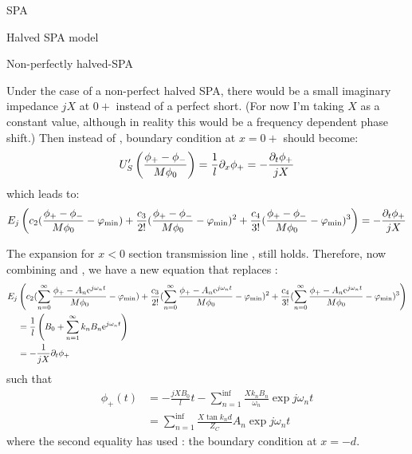 \documentclass[12pt,a4paper]{article}
\begin{document}
\begin{section}{SPA}
\begin{subsection}{Halved SPA model}
\end{subsection}


\begin{subsection}{Non-perfectly halved-SPA}

Under the case of a non-perfect halved SPA, there would be a small imaginary impedance $jX$ at $0+$ instead of a perfect short. (For now I'm taking $X$ as a constant value, although in reality this would be a frequency dependent phase shift.)
Then instead of , boundary condition at $x=0+$ should become:
\begin{equation}\label{eq:BC0+}
U_S'\left(\frac{\phi_+ - \phi_-}{M \phi_0}\right) = \frac{1}{l}\partial_x\phi_+ = -\frac{\partial_t\phi_+}{jX}
\end{equation}
which leads to: 
\begin{equation}\label{eq:BC0++}
E_j \left( c_2(\frac{\phi_+ - \phi_-}{M\phi_0} - \varphi_{\mathrm{min}}) + \frac{c_3}{2!}(\frac{\phi_+ - \phi_-}{M\phi_0} - \varphi_{\mathrm{min}})^2 +  \frac{c_4}{3!}(\frac{\phi_+ - \phi_-}{M\phi_0} - \varphi_{\mathrm{min}})^3 \right) = -\frac{\partial_t\phi_+}{jX}
\end{equation}

The expansion for $x<0$ section transmission line , still holds. Therefore, now combining  and , we have a new equation that replaces : 
\begin{equation}
\begin{aligned}
E_j &\left( c_2(\sum_{n=0}^\infty{\frac{\phi_+ - A_n \mathrm{e}^{j\omega_n t}}{M\phi_0}} - \varphi_{\mathrm{min}}) + \frac{c_3}{2!}(\sum_{n=0}^\infty{\frac{\phi_+ - A_n \mathrm{e}^{j\omega_n t}}{M\phi_0}} - \varphi_{\mathrm{min}})^2 +  \frac{c_4}{3!}(\sum_{n=0}^\infty{\frac{\phi_+ - A_n \mathrm{e}^{j\omega_n t}}{M\phi_0}} - \varphi_{\mathrm{min}})^3 \right) \\ 
&= \frac{1}{l} \left(B_0 + \sum_{n=1}^\infty k_n B_n\mathrm{e}^{j\omega_n t}\right)\\ 
&= -\frac{1}{jX}\partial_t\phi_+
\end{aligned}
\end{equation}
such that 
\begin{equation}\label{eq:phi_+}
\begin{aligned}
\phi_+(t) &= - \frac{jXB_0}{l}t - \sum_{n=1}^\inf \frac{X k_n B_n}{\omega_n}\exp{j\omega_n t}\\
&=\sum_{n=1}^\inf \frac{X \tan{k_n d}}{Z_C}A_n\exp{j\omega_n t}
\end{aligned}
\end{equation}
where the second equality has used : the boundary condition at $x=-d$. 


\end{subsection}
\end{section}
\end{document}
